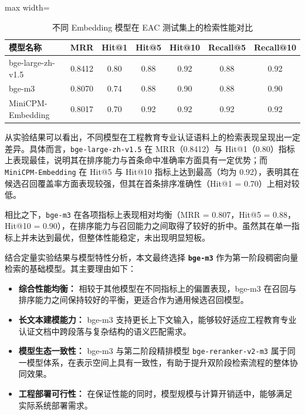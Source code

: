 \documentclass[UTF8,a4paper,zihao=-4]{ctexart}
\begin{document}
\begin{table}[H]
\centering
\caption{不同 Embedding 模型在 EAC 测试集上的检索性能对比}
\label{tab:embedding_comparison}
{\small
\renewcommand{\arraystretch}{1.2}
\begin{adjustbox}{max width=\textwidth}
\begin{tabular}{lcccccc}
\toprule
模型名称 & MRR & Hit@1 & Hit@5 & Hit@10 & Recall@5 & Recall@10 \\
\midrule
bge-large-zh-v1.5 & 0.8412 & 0.80 & 0.88 & 0.92 & 0.88 & 0.92 \\
bge-m3 & 0.8070 & 0.74 & 0.88 & 0.90 & 0.88 & 0.90 \\
MiniCPM-Embedding & 0.8017 & 0.70 & 0.92 & 0.92 & 0.92 & 0.92 \\
\bottomrule
\end{tabular}
\end{adjustbox}
}
\end{table}

从实验结果可以看出，不同模型在工程教育专业认证语料上的检索表现呈现出一定差异。具体而言，\texttt{bge-large-zh-v1.5} 在 MRR（0.8412）与 Hit@1（0.80）指标上表现最佳，说明其在排序能力与首条命中准确率方面具有一定优势；而 \texttt{MiniCPM-Embedding} 在 Hit@5 与 Hit@10 指标上达到最高（均为 0.92），表明其在候选召回覆盖率方面表现较强，但其在首条排序准确性（Hit@1 = 0.70）上相对较低。

相比之下，\texttt{bge-m3} 在各项指标上表现相对均衡（MRR = 0.807，Hit@5 = 0.88，Hit@10 = 0.90），在排序能力与召回能力之间取得了较好的折中。虽然其在单一指标上并未达到最优，但整体性能稳定，未出现明显短板。

结合定量实验结果与模型特性分析，本文最终选择 \textbf{\texttt{bge-m3}} 作为第一阶段稠密向量检索的基础模型。其主要理由如下：

\begin{itemize}
    \item \textbf{综合性能均衡：} 相较于其他模型在不同指标上的偏置表现，bge-m3 在召回与排序能力之间保持较好的平衡，更适合作为通用候选召回模型。
    
    \item \textbf{长文本建模能力：} bge-m3 支持更长上下文输入，能够较好适应工程教育专业认证文档中跨段落与复杂结构的语义匹配需求。
    
    \item \textbf{模型生态一致性：} bge-m3 与第二阶段精排模型 \texttt{bge-reranker-v2-m3} 属于同一模型体系，在表示空间上具有一致性，有助于提升双阶段检索流程的整体协同效果。
    
    \item \textbf{工程部署可行性：} 在保证性能的同时，模型规模与计算开销适中，能够满足实际系统部署需求。
\end{itemize}
\end{document}
